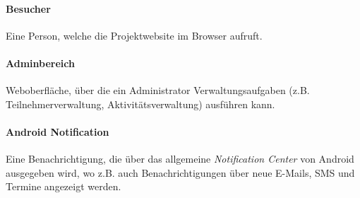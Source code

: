 \documentclass[10pt,a4paper]{article}
\begin{document}
\paragraph{Besucher} Eine Person, welche die Projektwebsite im Browser aufruft.

\paragraph{Adminbereich} Weboberfläche, über die ein Administrator Verwaltungsaufgaben (z.B. Teilnehmerverwaltung, Aktivitätsverwaltung) ausführen kann.

\paragraph{Android Notification} Eine Benachrichtigung, die über das allgemeine \emph{Notification Center} von Android ausgegeben wird, wo z.B. auch Benachrichtigungen über neue E-Mails, SMS und Termine angezeigt werden.
\end{document}

